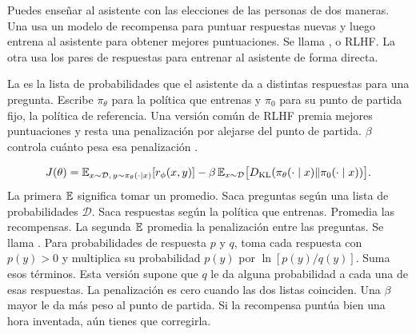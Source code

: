 {Puedes enseñar al asistente con las elecciones de las personas de dos maneras. Una usa un modelo de recompensa para puntuar respuestas nuevas y luego entrena al asistente para obtener mejores puntuaciones. Se llama , o RLHF. La otra usa los pares de respuestas para entrenar al asistente de forma directa.

\moremath
La  es la lista de probabilidades que el asistente da a distintas respuestas para una pregunta. Escribe \(\pi_\theta\) para la política que entrenas y \(\pi_0\) para su punto de partida fijo, la política de referencia. Una versión común de RLHF premia mejores puntuaciones y resta una penalización por alejarse del punto de partida. \(\beta\) controla cuánto pesa esa penalización \citep{instruct,dpo}.}
\begin{equation}
 J(\theta)=\mathbb E_{x\sim\mathcal D,\,y\sim\pi_\theta(\cdot\mid x)}[r_\phi(x,y)]
 -\beta\,\mathbb E_{x\sim\mathcal D}\big[D_{\mathrm{KL}}(\pi_\theta(\cdot\mid x)\Vert\pi_0(\cdot\mid x))\big].
 \label{eq:rlhf}
\end{equation}
{La primera \(\mathbb E\) significa tomar un promedio. Saca preguntas según una lista de probabilidades \(\mathcal D\). Saca respuestas según la política que entrenas. Promedia las recompensas. La segunda \(\mathbb E\) promedia la penalización entre las preguntas. Se llama . Para probabilidades de respuesta \(p\) y \(q\), toma cada respuesta con \(p(y)>0\) y multiplica su probabilidad \(p(y)\) por \(\ln[p(y)/q(y)]\). Suma esos términos. Esta versión supone que \(q\) le da alguna probabilidad a cada una de esas respuestas. La penalización es cero cuando las dos listas coinciden. Una \(\beta\) mayor le da más peso al punto de partida. Si la recompensa puntúa bien una hora inventada, aún tienes que corregirla.}

